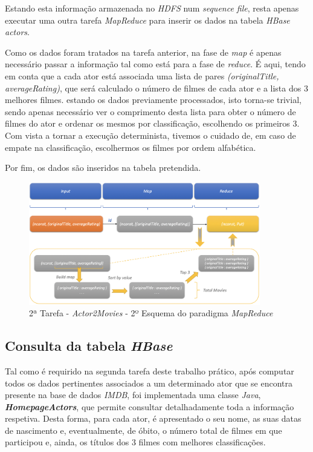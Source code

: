 \documentclass[a4paper]{report}
\begin{document}
{			Estando esta informação armazenada no \textit{HDFS} num \textit{sequence file}, resta apenas executar uma outra tarefa \textit{MapReduce} para inserir os dados na tabela \textit{HBase actors}.
			
			Como os dados foram tratados na tarefa anterior, na fase de \textit{map} é apenas necessário passar a informação tal como está para a fase de \textit{reduce}. É aqui, tendo em conta que a cada ator está associada uma lista de pares \textit{(originalTitle, averageRating)}, que será calculado o número de filmes de cada ator e a lista dos 3 melhores filmes. estando os dados previamente processados, isto torna-se trivial, sendo apenas necessário ver o comprimento desta lista para obter o número de filmes do ator e ordenar os mesmos por classificação, escolhendo os primeiros 3. Com vista a tornar a execução determinista, tivemos o cuidado de, em caso de empate na classificação, escolhermos os filmes por ordem alfabética.
			
			Por fim, os dados são inseridos na tabela pretendida.
			\begin{figure}[H]
				\centering
				\includegraphics[width=0.9\textwidth]{Imagens/2ª Tarefa - Actor2Movies - 2º Esquema MapReduce.png}
				\caption{2ª Tarefa - \textit{Actor2Movies} - 2º Esquema do paradigma \textit{MapReduce}}
				\label{fig:20}
			\end{figure}

		\subsection{Consulta da tabela \textit{HBase}} \label{subsec:Task2-4}
		Tal como é requirido na segunda tarefa deste trabalho prático, após computar todos os dados pertinentes associados a um determinado ator que se encontra presente na base de dados \textit{IMDB}, foi implementada uma classe \textit{Java}, \textit{\textbf{HomepageActors}}, que permite consultar detalhadamente toda a informação respetiva.
		Desta forma, para cada ator, é apresentado o seu nome, as suas datas de nascimento e, eventualmente, de óbito, o número total de filmes em que participou e, ainda, os títulos dos 3 filmes com melhores classificações.
		
}
\end{document}
